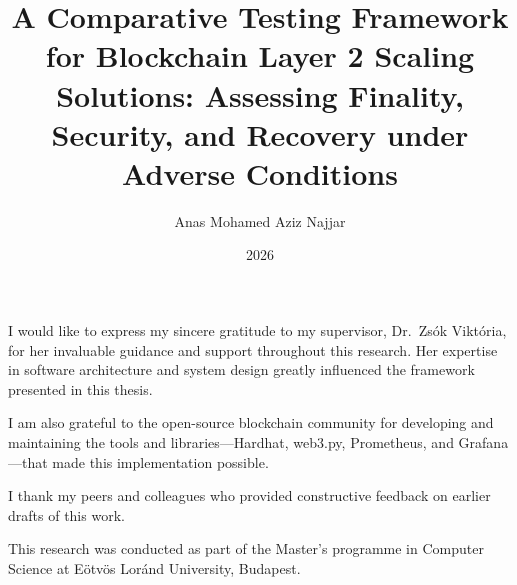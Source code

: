 \documentclass[
]{elteikthesis}[2024/04/26]
\title{A Comparative Testing Framework for Blockchain Layer 2 Scaling Solutions: Assessing Finality, Security, and Recovery under Adverse Conditions} %
\date{2026} %
\author{Anas Mohamed Aziz Najjar}
\affiliation{Associate Professor} %
\begin{document}


\maketitle
%

\tableofcontents
\cleardoublepage


\cleardoublepage


\cleardoublepage


\cleardoublepage


\cleardoublepage


\cleardoublepage


\cleardoublepage


\cleardoublepage


\cleardoublepage

\chapter*{\acklabel}
I would like to express my sincere gratitude to my supervisor, Dr.\ Zsók Viktória, for her invaluable guidance and support throughout this research. Her expertise in software architecture and system design greatly influenced the framework presented in this thesis.

I am also grateful to the open-source blockchain community for developing and maintaining the tools and libraries---Hardhat, web3.py, Prometheus, and Grafana---that made this implementation possible.

I thank my peers and colleagues who provided constructive feedback on earlier drafts of this work.

This research was conducted as part of the Master's programme in Computer Science at Eötvös Loránd University, Budapest.
\end{document}
